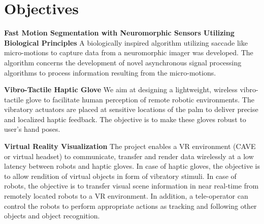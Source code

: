 \chapter{Objectives}\label{ch:introduction}



{\bf Fast Motion Segmentation with Neuromorphic Sensors Utilizing Biological Principles}
A biologically inspired algorithm utilizing saccade like micro-motions
to capture data from a neuromorphic imager was developed. The
algorithm concerns the development of novel asynchronous signal
processing algorithms to process information resulting from the
micro-motions.

{\bf Vibro-Tactile Haptic Glove}
We aim at designing a lightweight, wireless vibro-tactile glove to facilitate human perception of remote robotic environments. The vibratory actuators are placed at sensitive locations of the palm to deliver precise and localized haptic feedback. The objective is to make these gloves robust to user’s hand poses.


 {\bf Virtual Reality Visualization}
 The project enables a VR environment (CAVE or virtual headset) to
 communicate, transfer and render data wirelessly at a low latency
 between robots and haptic gloves. In case of haptic gloves, the
 objective is to allow rendition of virtual objects in form of
 vibratory stimuli. In case of robots, the objective is to transfer
 visual scene information in near real-time from remotely located
 robots to a VR environment. In addition, a tele-operator can control
 the robots to perform appropriate actions as tracking and following
 other objects and object recognition.

